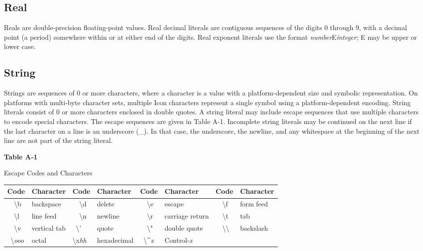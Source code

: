 \subsection*{Real}

Reals are double-precision floating-point values.
Real decimal literals are contiguous sequences of the digits 0 through
9, with a decimal point (a period) somewhere within or at either end of
the digits. Real exponent literals use the format
\textit{number}E\textit{integer}; E may be upper or lower case.

\subsection*{String}

Strings are sequences of 0 or more characters, where a
character is a value with a platform-dependent size and symbolic
representation. On platforms with multi-byte character sets, multiple
Icon characters represent a single symbol using a platform-dependent
encoding.
String literals consist of 0 or more characters enclosed in double
quotes. A string literal may include escape sequences that use multiple
characters to encode special characters. The escape sequences are given
in Table A-1. Incomplete string literals may
be continued on the next line if the last character on a line is an
underscore (\_). In that case, the underscore, the newline, and any
whitespace at the beginning of the next line are not part of the string
literal.

\begin{center}
{\sffamily\bfseries
Table A-1

Escape Codes and Characters 
}
\end{center}

\begin{center}
\begin{supertabular}{|m{0.38in}|m{0.8in}|m{0.4in}|m{0.855in}|m{0.38in}|m{1.14in}|m{0.38in}|m{0.68in}|}
\hline
\sffamily\bfseries Code &
\sffamily\bfseries Character &
\sffamily\bfseries Code &
\sffamily\bfseries Character &
\sffamily\bfseries Code &
\sffamily\bfseries Character &
\sffamily\bfseries Code &
\sffamily\bfseries Character\\\hline
\ \ {\textbackslash}b &
backspace &
\ \ {\textbackslash}d &
delete &
\ \ {\textbackslash}e &
escape &
\ \ {\textbackslash}f &
form feed\\\hline
\ \ {\textbackslash}l &
line feed &
\ \ {\textbackslash}n &
newline &
\ \ {\textbackslash}r &
carriage return &
\ \ {\textbackslash}t &
tab\\\hline
\ \ {\textbackslash}v &
vertical tab &
\ {\textbackslash}' &
quote &
\ \ {\textbackslash}" &
double quote &
\ \ {\textbackslash}{\textbackslash} &
backslash\\\hline
\ {\textbackslash}\textit{ooo} &
octal &
{\textbackslash}x\textit{hh} &
hexadecimal  &
\ {\textbackslash}\^{}\textit{x} &
Control-\textit{x} &
~
 &
~
\\\hline
\end{supertabular}
\end{center}


